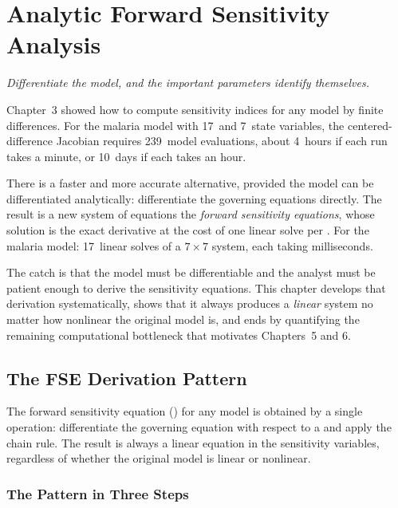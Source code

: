 \chapter{Analytic Forward Sensitivity Analysis}

\begin{flushright}
\textit{Differentiate the model, and the important parameters identify themselves.}
\end{flushright}

\bigskip

Chapter~3 showed how to compute sensitivity indices for any model
by finite differences. For the malaria model with 17~\POIs and
7~state variables, the centered-difference Jacobian requires
239~model evaluations, about 4~hours if each run takes a minute,
or 10~days if each takes an hour.

There is a faster and more accurate alternative, provided the model
can be differentiated analytically: differentiate the governing
equations directly. The result is a new system of equations
the \emph{forward sensitivity equations}, whose solution
is the exact derivative at the cost of one linear solve per \POI.
For the malaria model: 17~linear solves of a $7\times7$ system,
each taking milliseconds.

The catch is that the model must be differentiable and the
analyst must be patient enough to derive the sensitivity equations.
This chapter develops that derivation systematically,
shows that it always produces a \emph{linear} system no matter
how nonlinear the original model is, and ends by quantifying
the remaining computational bottleneck that motivates
Chapters~5 and 6.

\section{The FSE Derivation Pattern}
\label{sec:FSEpattern}

The forward sensitivity equation (\FSE) for any model is obtained
by a single operation: differentiate the governing equation with
respect to a \POI and apply the chain rule.
The result is always a linear equation in the sensitivity variables,
regardless of whether the original model is linear or nonlinear.

\subsection{The Pattern in Three Steps}

